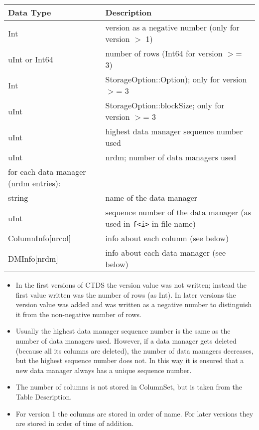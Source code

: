 \vspace{0.15in}
\begin{tabular}{|l|p{13cm}|} \hline
  Data Type & Description \\ \hline\hline
  Int & version as a negative number (only for version $>$ 1) \\
  uInt or Int64 & number of rows (Int64 for version $>$= 3) \\
  Int & StorageOption::Option); only for version $>$= 3 \\
  uInt & StorageOption::blockSize; only for version $>$= 3 \\
  uInt & highest data manager sequence number used \\
  uInt & nrdm; number of data managers used \\
  \hline
  for each data manager (nrdm entries): & \\
  string & name of the data manager \\
  uInt & sequence number of the data manager (as used in \texttt{f<i>} in
  file name) \\
  \hline
  ColumnInfo[nrcol] & info about each column (see below) \\
  DMInfo[nrdm] & info about each data manager (see below) \\
  \hline
\end{tabular}
\vspace{0.15in}

\begin{itemize}
\item
In the first versions of CTDS the version value was not written;
instead the first value written was the number of rows (as Int).
In later versions the version value was added and was written as a
negative number to distinguish it from the non-negative number of rows.
\item
Usually the highest data manager sequence number is the same as the
number of data managers used. However, if a data manager gets deleted
(because all its columns are deleted), the number of data managers
decreases, but the highest sequence number does not. In this way it is
ensured that a new data manager always has a unique sequence number.
\item
The number of columns is not stored in ColumnSet, but is taken from
the Table Description.
\item
For version 1 the columns are stored in order of name. For later
versions they are stored in order of time of addition.
\end{itemize}

